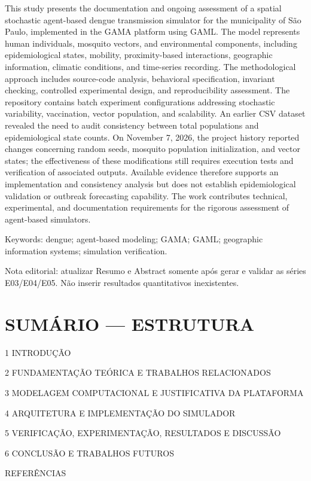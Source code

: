 This study presents the documentation and ongoing assessment of a
spatial stochastic agent-based dengue transmission simulator for the
municipality of São Paulo, implemented in the GAMA platform using GAML.
The model represents human individuals, mosquito vectors, and
environmental components, including epidemiological states, mobility,
proximity-based interactions, geographic information, climatic
conditions, and time-series recording. The methodological approach
includes source-code analysis, behavioral specification, invariant
checking, controlled experimental design, and reproducibility
assessment. The repository contains batch experiment configurations
addressing stochastic variability, vaccination, vector population, and
scalability. An earlier CSV dataset revealed the need to audit
consistency between total populations and epidemiological state counts.
On November 7, 2026, the project history reported changes concerning
random seeds, mosquito population initialization, and vector states; the
effectiveness of these modifications still requires execution tests and
verification of associated outputs. Available evidence therefore
supports an implementation and consistency analysis but does not
establish epidemiological validation or outbreak forecasting capability.
The work contributes technical, experimental, and documentation
requirements for the rigorous assessment of agent-based simulators.

Keywords: dengue; agent-based modeling; GAMA; GAML; geographic
information systems; simulation verification.

Nota editorial: atualizar Resumo e Abstract somente após gerar e validar
as séries E03/E04/E05. Não inserir resultados quantitativos
inexistentes.

\section{SUMÁRIO --- ESTRUTURA}\label{sumuxe1rio-estrutura}

1 INTRODUÇÃO

2 FUNDAMENTAÇÃO TEÓRICA E TRABALHOS RELACIONADOS

3 MODELAGEM COMPUTACIONAL E JUSTIFICATIVA DA PLATAFORMA

4 ARQUITETURA E IMPLEMENTAÇÃO DO SIMULADOR

5 VERIFICAÇÃO, EXPERIMENTAÇÃO, RESULTADOS E DISCUSSÃO

6 CONCLUSÃO E TRABALHOS FUTUROS

REFERÊNCIAS

